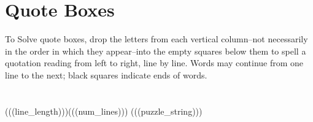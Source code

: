 \documentclass{article}
\begin{document}
\section*{Quote Boxes}
To Solve quote boxes, drop the letters from each vertical column--not necessarily in the order in which they appear--into the empty squares below them to spell a quotation reading from left to right, line by line. Words may continue from one line to the next; black squares indicate ends of words.
\section*{}
\begin{Puzzle}{(((line_length)))}{(((num_lines)))}
(((puzzle_string)))
\end{Puzzle}
\end{document}
